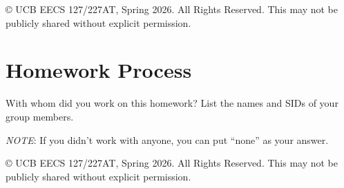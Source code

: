 \documentclass[10pt]{article}
\theoremstyle{definition}
\theoremstyle{plain}
\begin{document}
\vfill
\noindent\footnotesize{\copyright{} UCB EECS 127/227AT, Spring 2026. \scriptsize{All Rights Reserved. This may not be publicly shared without explicit permission.}}

\newpage

\section{Homework Process}

With whom did you work on this homework? List the names and SIDs of your group members.

\textit{NOTE}: If you didn't work with anyone, you can put ``none'' as your answer.

\vfill
\noindent\footnotesize{\copyright{} UCB EECS 127/227AT, Spring 2026. \scriptsize{All Rights Reserved. This may not be publicly shared without explicit permission.}}
\end{document}
